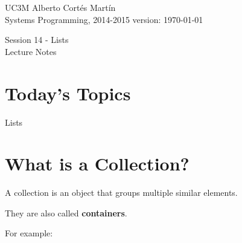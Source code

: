 \documentclass[a4paper, 9pt]{extarticle}
\newcommand{\realtitle}{Session 14 - Lists}
\begin{document}
\makebox[\linewidth]{\rule{\textwidth}{0.4pt}}
UC3M \hfill Alberto Cortés Martín\\
Systems Programming, 2014-2015 \hfill version: \today\\
\makebox[\linewidth]{\rule{\textwidth}{0.4pt}}
\begin{center}
  \Large{\realtitle}\\Lecture Notes
\end{center}
\makebox[\linewidth]{\rule{\textwidth}{0.4pt}}
\vspace{1cm}


\section{Today's Topics}
\begin{blackboard}
Lists
\end{blackboard}


\section{What is a Collection?}

A collection is an object that groups multiple similar elements.

They are also called \textbf{containers}.

For example:
\end{document}
